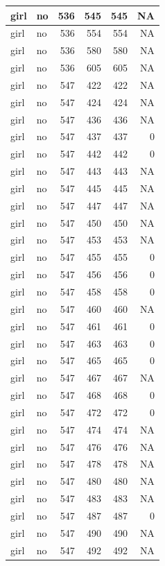 \documentclass[man]{apa6}
\begin{document}
\begin{tabular}{l|l|r|r|r|r}
\hline
girl & no & 536 & 545 & 545 & NA\\
\hline
girl & no & 536 & 554 & 554 & NA\\
\hline
girl & no & 536 & 580 & 580 & NA\\
\hline
girl & no & 536 & 605 & 605 & NA\\
\hline
girl & no & 547 & 422 & 422 & NA\\
\hline
girl & no & 547 & 424 & 424 & NA\\
\hline
girl & no & 547 & 436 & 436 & NA\\
\hline
girl & no & 547 & 437 & 437 & 0\\
\hline
girl & no & 547 & 442 & 442 & 0\\
\hline
girl & no & 547 & 443 & 443 & NA\\
\hline
girl & no & 547 & 445 & 445 & NA\\
\hline
girl & no & 547 & 447 & 447 & NA\\
\hline
girl & no & 547 & 450 & 450 & NA\\
\hline
girl & no & 547 & 453 & 453 & NA\\
\hline
girl & no & 547 & 455 & 455 & 0\\
\hline
girl & no & 547 & 456 & 456 & 0\\
\hline
girl & no & 547 & 458 & 458 & 0\\
\hline
girl & no & 547 & 460 & 460 & NA\\
\hline
girl & no & 547 & 461 & 461 & 0\\
\hline
girl & no & 547 & 463 & 463 & 0\\
\hline
girl & no & 547 & 465 & 465 & 0\\
\hline
girl & no & 547 & 467 & 467 & NA\\
\hline
girl & no & 547 & 468 & 468 & 0\\
\hline
girl & no & 547 & 472 & 472 & 0\\
\hline
girl & no & 547 & 474 & 474 & NA\\
\hline
girl & no & 547 & 476 & 476 & NA\\
\hline
girl & no & 547 & 478 & 478 & NA\\
\hline
girl & no & 547 & 480 & 480 & NA\\
\hline
girl & no & 547 & 483 & 483 & NA\\
\hline
girl & no & 547 & 487 & 487 & 0\\
\hline
girl & no & 547 & 490 & 490 & NA\\
\hline
girl & no & 547 & 492 & 492 & NA\\

\end{tabular}
\end{document}
